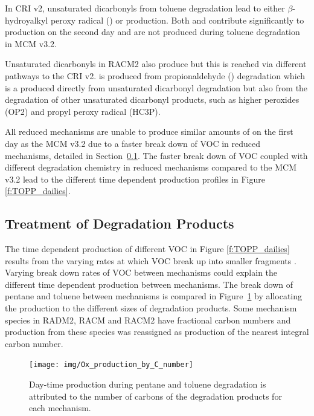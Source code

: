 In CRI v2, unsaturated dicarbonyls from toluene degradation lead to either $\beta$-hydroyalkyl peroxy radical () or  production.
Both  and  contribute significantly to  production on the second day and are not produced during toluene degradation in MCM v3.2.

Unsaturated dicarbonyls in RACM2 also produce  but this is reached via different pathways to the CRI v2.
 is produced from propionaldehyde () degradation which is a produced directly from unsaturated dicarbonyl degradation but also from the degradation of other unsaturated dicarbonyl products, such as higher peroxides (OP2) and propyl peroxy radical (HC3P).

All reduced mechanisms are unable to produce similar amounts of  on the first day as the MCM v3.2 due to a faster break down of VOC in reduced mechanisms, detailed in \mbox{Section \ref{ss:products}}.
The faster break down of VOC coupled with different degradation chemistry in reduced mechanisms compared to the MCM v3.2 lead to the different time dependent  production profiles in Figure \ref{f:TOPP_dailies}.


\subsection{Treatment of Degradation Products} \label{ss:products} 

The time dependent  production of different VOC in Figure \ref{f:TOPP_dailies} results from the varying rates at which VOC break up into smaller fragments \citep{Butler:2011}.
Varying break down rates of VOC between mechanisms could explain the different time dependent  production between mechanisms.
The break down of pentane and toluene between mechanisms is compared in \mbox{Figure \ref{f:carbon}} by allocating the  production to the different sizes of degradation products.
Some mechanism species in RADM2, RACM and RACM2 have fractional carbon numbers \citep{Stockwell:1990, Stockwell:1997, Goliff:2013} and  production from these species was reassigned as  production of the nearest integral carbon number.  

\begin{figure}
    \centering
    \texttt{[image: img/Ox\_production\_by\_C\_number]}
    \vspace{0mm}
    \caption{Day-time  production during pentane and toluene degradation is attributed to the number of carbons of the degradation products for each mechanism.}
    \vspace{-4mm}
    \label{f:carbon}
\end{figure}

